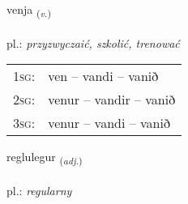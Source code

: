 \documentclass[frontgrid, backgrid]{flacards}\usepackage[]{graphicx}\usepackage[]{xcolor}
\begin{document}
\renewcommand{\flhead}{\vskip5pt \fboxsep=0pt {\small\bfseries\footnotesize Sagnorð | czasownik}}
\renewcommand{\fcfoot}{\vskip5pt \fboxsep=0pt \hspace{2pt}{\small\bfseries\footnotesize 3K}}

\renewcommand{\blhead}{\vskip5pt {\small\bfseries\footnotesize Sagnorð | czasownik }}
\renewcommand{\bcfoot}{\vskip5pt \hspace{2pt}{\small\bfseries\footnotesize 3K}}


{venja \small{\textsubscript{(\textit{v.})}} \\[1ex] %
\textphonetic{[vɛnja]} \\
pl.: \emph{przyzwyczaić, szkolić, trenować} \\  [2ex]
\renewcommand*{\arraystretch}{0.8}
\begin{tabular}{p{1cm}l}
\textsc{1sg}: & ven -- vandi -- vanið \\ 
\textsc{2sg}: & venur -- vandir -- vanið \\ 
\textsc{3sg}: & venur -- vandi -- vanið \\ 
\end{tabular}
}

\renewcommand{\flhead}{\vskip5pt \fboxsep=0pt {\small\bfseries\footnotesize Lýsingarorð | przymiotnik}}
\renewcommand{\fcfoot}{\vskip5pt \fboxsep=0pt \hspace{2pt}{\small\bfseries\footnotesize 3K}}

\renewcommand{\blhead}{\vskip5pt {\small\bfseries\footnotesize Lýsingarorð | przymiotnik }}
\renewcommand{\bcfoot}{\vskip5pt \hspace{2pt}{\small\bfseries\footnotesize 3K}}


{reglulegur \small{\textsubscript{(\textit{adj.})}} \\[1ex] %
\textphonetic{[rɛklʏlɛɣʏr]} \\
pl.: \emph{regularny} \\  [2ex]
\renewcommand*{\arraystretch}{0.8}
}
\end{document}
